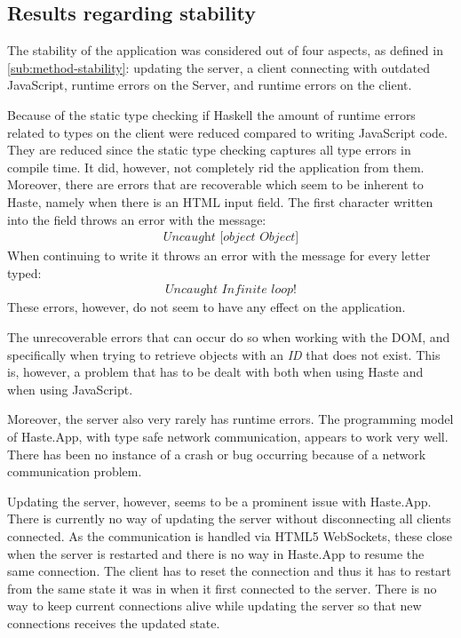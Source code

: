 \documentclass[a4paper]{article}
\begin{document}
\subsection{Results regarding stability}
\label{sub:stability-results}
The stability of the application was considered out of four aspects, as defined in \cref{sub:method-stability}: updating the server, a client connecting with outdated JavaScript, runtime errors on the Server, and runtime errors on the client. 

Because of the static type checking if Haskell the amount of runtime errors related to types on the client were reduced compared to writing JavaScript code. They are reduced since the static type checking captures all type errors in compile time. It did, however, not completely rid the application from them. Moreover, there are errors that are recoverable which seem to be inherent to Haste, namely when there is an HTML input field. The first character written into the field throws an error with the message:
\begin{align*}
    \textit{Uncaught [object Object]}
\end{align*} 
When continuing to write it throws an error with the message for every letter typed:
\begin{align*}
    \textit{Uncaught Infinite loop!}
\end{align*}
These errors, however, do not seem to have any effect on the application.

The unrecoverable errors that can occur do so when working with the DOM, and specifically when trying to retrieve objects with an \textit{ID} that does not exist. This is, however, a problem that has to be dealt with both when using Haste and when using JavaScript.

Moreover, the server also very rarely has runtime errors. The programming model of Haste.App, with type safe network communication, appears to work very well. There has been no instance of a crash or bug occurring because of a network communication problem.

Updating the server, however, seems to be a prominent issue with Haste.App. There is currently no way of updating the server without disconnecting all clients connected. As the communication is handled via HTML5 WebSockets, these close when the server is restarted and there is no way in Haste.App to resume the same connection. The client has to reset the connection and thus it has to restart from the same state it was in when it first connected to the server. There is no way to keep current connections alive while updating the server so that new connections receives the updated state.
\end{document}
